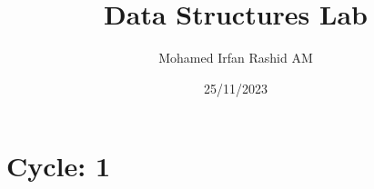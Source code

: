 \documentclass[9pt]{Lab_Report_Class}
\begin{document}
\title{Data Structures Lab}
\author{Mohamed Irfan Rashid AM}
\date{25/11/2023}

\maketitle
\thispagestyle{empty}
\tableofcontents
\thispagestyle{empty}

\part{Cycle: 1}


\end{document}
